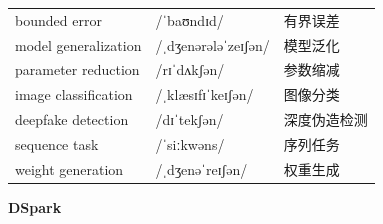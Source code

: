 \documentclass[UTF8,12pt,a4paper]{ctexart}
\providecommand{\zh}[1]{#1}
\begin{document}
\begin{tabular*}{\textwidth}{@{\extracolsep{\fill}}lll@{}}
bounded error & {\ipafont /ˈbaʊndɪd/} & \zh{有界误差} \\
model generalization & {\ipafont /ˌdʒenərələˈzeɪʃən/} & \zh{模型泛化} \\
parameter reduction & {\ipafont /rɪˈdʌkʃən/} & \zh{参数缩减} \\
image classification & {\ipafont /ˌklæsɪfɪˈkeɪʃən/} & \zh{图像分类} \\
deepfake detection & {\ipafont /dɪˈtekʃən/} & \zh{深度伪造检测} \\
sequence task & {\ipafont /ˈsiːkwəns/} & \zh{序列任务} \\
weight generation & {\ipafont /ˌdʒenəˈreɪʃən/} & \zh{权重生成} \\
\bottomrule
\end{tabular*}

\newpage

\begin{center}
    {\Large\bfseries DSpark}
\end{center}
\end{document}
